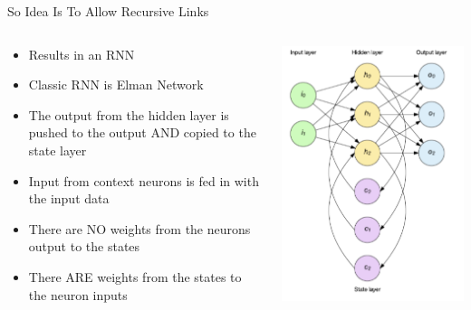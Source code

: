 \documentclass[aspectratio=169]{beamer}
\begin{document}
\begin{frame}{So Idea Is To Allow Recursive Links}

\begin{columns}
\begin{column}{0.6\textwidth}
\begin{itemize}
	\item Results in an RNN
	\item Classic RNN is Elman Network
	\item The output from the hidden layer is pushed to the output AND copied to the state layer
	\item Input from context neurons is fed in with the input data
	\item There are NO weights from the neurons output to the states
	\item There ARE weights from the states  to the neuron inputs
\end{itemize}
\end{column}
\begin{column}{0.4\textwidth}
\includegraphics[width=1\textwidth]{lectRNN/Elman.png}
\end{column}
\end{columns}
\end{frame}
\end{document}
